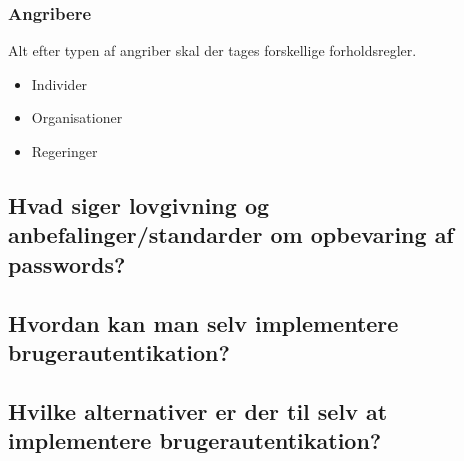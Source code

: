\subsubsection{Angribere}
Alt efter typen af angriber skal der tages forskellige forholdsregler.

\begin{itemize}
	\item Individer
	\item Organisationer
	\item Regeringer
\end{itemize}

\subsection{Hvad siger lovgivning og anbefalinger/standarder om opbevaring af passwords?}
\subsection{Hvordan kan man selv implementere brugerautentikation?}
\subsection{Hvilke alternativer er der til selv at implementere brugerautentikation?}
